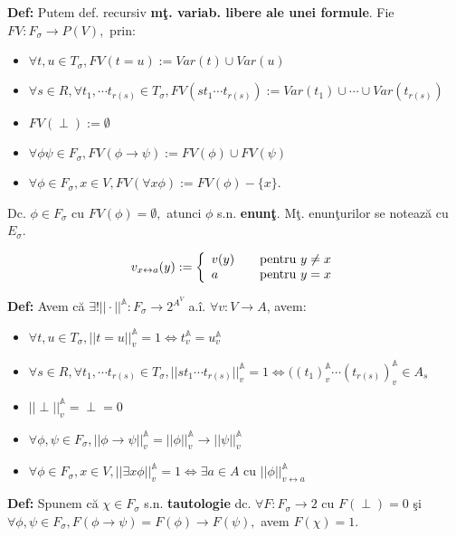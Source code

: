 \documentclass{article}
\begin{document}
\textbf{Def:} Putem def. recursiv \textbf{m\c t. variab. libere ale unei formule}. Fie $FV:F_\sigma\rightarrow P(V),$ prin:
\begin{itemize}
    \item $\forall t,u\in T_\sigma, FV(t=u):=Var(t)\cup Var(u)$
    \item $\forall s\in R,\forall t_1,\cdots t_{r(s)}\in T_\sigma, FV(st_1\cdots t_{r(s)}):=Var(t_1)\cup\cdots\cup Var(t_{r(s)})$
    \item $FV(\perp):=\emptyset$
    \item $\forall\phi\psi\in F_\sigma,FV(\phi\rightarrow\psi):=FV(\phi)\cup FV(\psi)$
     \item $\forall\phi\in F_\sigma ,x\in V, FV(\forall x\phi):=FV(\phi)-\{x\}$.
    
\end{itemize}
Dc. $\phi\in F_\sigma$ cu $FV(\phi)=\emptyset,$ atunci $\phi$ s.n. \textbf{enun\c t}. M\c t. enun\c turilor se noteaz\u a cu $E_\sigma$.

\[ v_{x\leftrightarrow a}(y):= \left\{ \begin{array}{l l} v(y) & \quad \text{pentru $y\neq x$}\\ a & \quad \text{pentru $y=x$}\\ \end{array} \right. \]

\textbf{Def:} Avem c\u a $\exists! ||\cdot||^{\mathbb A}:F_\sigma\rightarrow 2^{A^V}$ a.\^ i. $\forall v:V\rightarrow A$, avem:
\begin{itemize}
    \item $\forall t,u\in T_\sigma, ||t=u||_v^{\mathbb A}=1\iff t_v^{\mathbb A}=u_v^{\mathbb A}$
    \item $\forall s\in R,\forall t_1,\cdots t_{r(s)}\in T_\sigma,||st_1\cdots t_{r(s)}||_v^{\mathbb A}=1\iff((t_1)_v^{\mathbb A}\cdots (t_{r(s)})_v^{\mathbb A}\in A_s $
    \item $||\perp||_v^{\mathbb A}=\perp=0$
    \item $\forall \phi,\psi\in F_\sigma,||\phi\rightarrow\psi||_v^{\mathbb A}=||\phi||_v^{\mathbb A}\rightarrow ||\psi||_v^{\mathbb A}$
    \item $\forall \phi\in F_\sigma,x\in V, ||\exists x\phi||_v^{\mathbb A}=1\iff\exists a \in A $ cu $||\phi||_{v\leftrightarrow a}^{\mathbb A}$
\end{itemize}

\textbf{Def:} Spunem c\u a $\chi\in F_\sigma$ s.n. \textbf{tautologie} dc. $\forall F:F_\sigma\rightarrow 2$ cu $F(\perp)=0$ \c si $\forall\phi,\psi\in F_\sigma, F(\phi\rightarrow\psi)=F(\phi)\rightarrow F(\psi),$ avem $F(\chi)=1$.
\end{document}
